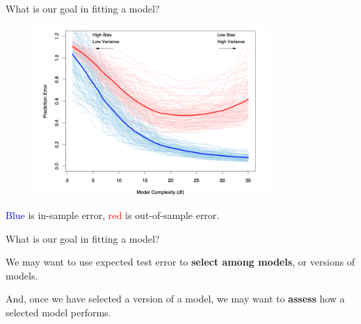 \documentclass[xcolor={table}, handout]{beamer}
\begin{document}
\begin{frame}{What is our goal in fitting a model?}


\begin{figure}
\centering
\includegraphics[width = 0.8\textwidth]{../assets/tibshirani7-1.png}
\end{figure}
\hfill \cite{hastie2009elements}

\textcolor{blue}{Blue} is in-sample error, \textcolor{red}{red} is out-of-sample error.

\end{frame}





\begin{frame}{What is our goal in fitting a model?}

\begin{wideitemize}
\item We may want to use expected test error to \textbf{select among models}, or versions of models.\pause
\item And, once we have selected a version of a model, we may want to \textbf{assess} how a selected model performs. 
\end{wideitemize}

\end{frame}


\end{document}
